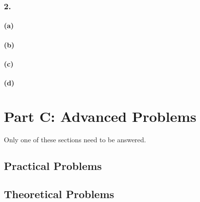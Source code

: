 \documentclass[12pt]{report}
\begin{document}
\subsection*{2.}
\subsubsection*{(a)}

\subsubsection*{(b)}

\subsubsection*{(c)}

\subsubsection*{(d)}

\chapter*{Part C: Advanced Problems}
Only one of these sections need to be answered.
\section*{Practical Problems}

\section*{Theoretical Problems}
\end{document}
